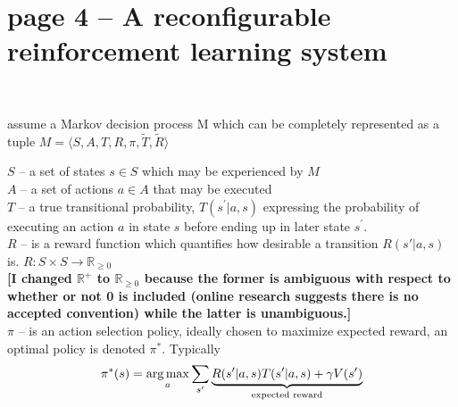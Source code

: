  
  
\section*{page 4 -- A reconfigurable reinforcement learning system}

{\ }\\

\begin{center}
\end{center}

assume a Markov decision process M which can be completely represented as a tuple \( M = \langle S, A, T, R, \pi, \tilde{T}, \tilde{R}\rangle \)\\

\begin{minipage}{5in}
\(S\) -- a set of states $s\in S$ which may be experienced by $M$\\
$A$ -- a set of actions $a\in A$ that may be executed\\
$T$ -- a true transitional probability, $T(s^{\prime}|a,s)$ expressing the probability of executing an action $a$ in state $s$ before ending up in later state $s^{\prime}$.\\
$R$ -- is a reward function which quantifies how desirable a transition $R(s'|a,s)$ is. $R: S\times S\rightarrow \mathbb{R}_{\geq 0}$\\
\textbf{[I changed $\mathbb{R}^{+}$ to $\mathbb{R}_{\geq 0}$ because the former is ambiguous with respect to whether or not 0 is included (online research suggests there is no accepted convention) while the latter is unambiguous.]}\\
$\pi$ -- is an action selection policy, ideally chosen to maximize expected reward, an optimal policy is denoted $\pi^*$. Typically
\begin{equation*}
\pi^*(s) = \operatorname*{arg\,max}_{a}\sum_{s^\prime}\underbrace{R(s^\prime|a,s) T(s'|a,s)+\gamma V(s^\prime)}_{\text{expected reward}}
\end{equation*}
\end{minipage}

